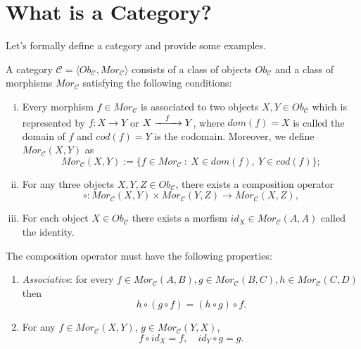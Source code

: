 \section{What is a Category?}

Let's formally define a category and provide some examples.

\begin{definition}[Category]
	A category $\mathcal C = \langle Ob_{\mathcal C}, Mor_{\mathcal C} \rangle$ consists
	of a class of objects $Ob_\mathcal C$ and a class of morphisms
	$Mor_\mathcal C$ satisfying the following conditions:
	\begin{enumerate}[(i)]
		\item Every morphism $f \in Mor_\mathcal C$ is associated to two objects $X,Y \in Ob_{\mathcal C}$
		      which is represented by $f:X \to Y$ or $X \xrightarrow{\hspace{3mm}f \hspace{3mm}} Y$,
		      where $dom(f) = X$ is called the domain of $f$ and $cod(f)=Y$ is the codomain. Moreover, we define
		      $Mor_\mathcal C (X,Y)$ as
		      \begin{displaymath}
			      Mor_\mathcal C (X,Y) := \{f \in Mor_\mathcal C \ : \ X \in dom(f), \ Y \in cod(f)\};
		      \end{displaymath}
		\item For any three objects $X,Y, Z \in Ob_\mathcal C$, there exists a composition operator
		      \begin{displaymath}
			      \circ: Mor_\mathcal C (X,Y)   \times Mor_\mathcal C (Y,Z) \to Mor_\mathcal C (X,Z),
		      \end{displaymath}
		\item For each object $X \in Ob_\mathcal C$ there exists a morfism $id_X \in Mor_\mathcal C (A,A)$
		      called the identity.
	\end{enumerate}
	The composition operator must have the following properties:
	\begin{enumerate}[(p.1)]
		\item \textit{Associative}: for every $f \in Mor_\mathcal C (A,B),
			      g \in Mor_\mathcal C (B,C), h \in Mor_\mathcal C (C,D)$ then
		      \begin{displaymath}
			      h \circ (g \circ f) = (h \circ g) \circ f.
		      \end{displaymath}
		\item For any $f \in Mor_\mathcal C (X,Y)$, $g \in Mor_\mathcal C (Y,X)$,
		      \begin{displaymath}
			      f \circ id_X = f,  \quad id_Y \circ g = g.
		      \end{displaymath}
	\end{enumerate}
\end{definition}

